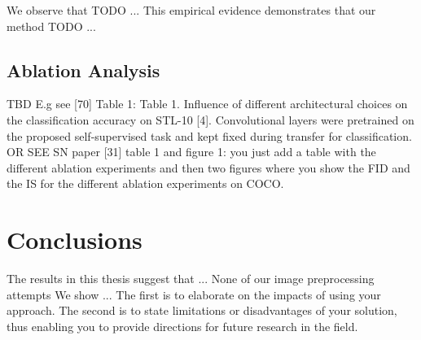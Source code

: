 \documentclass[12pt,a4paper]{article}
\begin{document}
We observe that TODO ... This empirical evidence demonstrates that our method TODO ...

\subsection{Ablation Analysis}
TBD
E.g see [70] Table 1:
Table 1. Influence of different architectural choices on the classification
accuracy on STL-10 [4]. Convolutional layers were pretrained
on the proposed self-supervised task and kept fixed during
transfer for classification.
OR SEE SN paper [31] table 1 and figure 1: you just add a table with the different ablation experiments and then two figures where you show the FID and the IS for the different ablation experiments on COCO.



\section{Conclusions}\label{sec:conclusion}
The results in this thesis suggest that ...
None of our image preprocessing attempts
We show ...
The first is
to elaborate on the impacts of using your approach. The
second is to state limitations or disadvantages of your solution,
thus enabling you to provide directions for future
research in the field.

\end{document}
